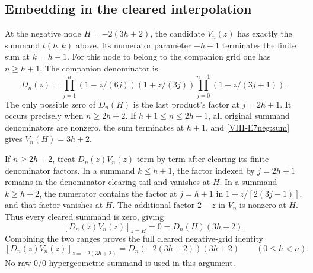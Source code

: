 \documentclass[11pt,letterpaper]{article}
\numberwithin{equation}{section}
\begin{document}
\subsection{Embedding in the cleared interpolation}
At the negative node $H=-2(3h+2)$, the candidate $V_n(z)$ has
exactly the summand $t(h,k)$ above. Its numerator parameter
$-h-1$ terminates the finite sum at $k=h+1$.
For this node to belong to the companion grid one has $n\ge h+1$.
The companion denominator is
\[
 D_n(z)=\prod_{j=1}^n(1-z/(6j))(1+z/(3j))
         \prod_{j=0}^{n-1}(1+z/(3j+1)).
\]
The only possible zero of $D_n(H)$ is the last product's factor
at $j=2h+1$. It occurs precisely when $n\ge2h+2$.
If $h+1\le n\le2h+1$, all original summand denominators are nonzero,
the sum terminates at $h+1$, and \eqref{VIII-E7neg:sum} gives
$V_n(H)=3h+2$.

If $n\ge2h+2$, treat $D_n(z)V_n(z)$ term by term after clearing
its finite denominator factors. In a summand $k\le h+1$, the
factor indexed by $j=2h+1$ remains in the denominator-clearing
tail and vanishes at $H$. In a summand $k\ge h+2$, the numerator
contains the factor at $j=h+1$ in
$1+z/[2(3j-1)]$, and that factor vanishes at $H$.
The additional factor $2-z$ in $V_n$ is nonzero at $H$.
Thus every cleared summand is zero, giving
\[
 [D_n(z)V_n(z)]_{z=H}=0=D_n(H)(3h+2).
\]
Combining the two ranges proves the full cleared negative-grid identity
\begin{equation}\label{VIII-E7neg:cleared}
 \boxed{[D_n(z)V_n(z)]_{z=-2(3h+2)}
 =D_n(-2(3h+2))(3h+2)\qquad(0\le h<n).}
\end{equation}
No raw $0/0$ hypergeometric summand is used in this argument.
\end{document}
